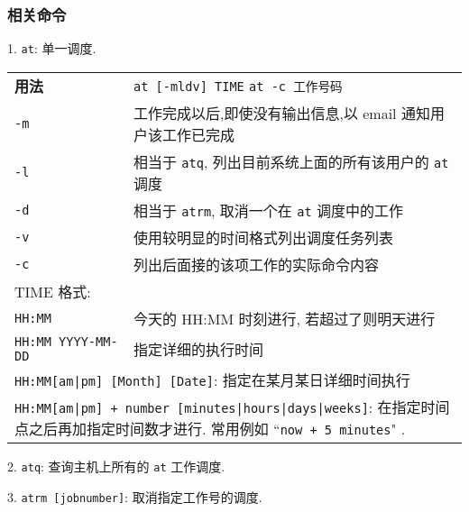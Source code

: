\subsubsection{相关命令}
\par
1. \texttt{at}: 单一调度.
\begin{longtable}{l@{ : }p{}}\hline\hline

    \textbf{用法} & \verb"at [-mldv] TIME" \newline
                    \verb"at -c 工作号码"  \\

    \texttt{-m} & 工作完成以后,即使没有输出信息,以 email 通知用户该工作已完成\\

    \texttt{-l} & 相当于 \texttt{atq}, 列出目前系统上面的所有该用户的 \texttt{at} 调度\\

    \texttt{-d} & 相当于 \texttt{atrm}, 取消一个在 \texttt{at} 调度中的工作 \\

    \texttt{-v} & 使用较明显的时间格式列出调度任务列表\\

    \texttt{-c} & 列出后面接的该项工作的实际命令内容 \\

    \multicolumn{2}{l}{TIME 格式:}\\

    \texttt{HH:MM} & 今天的 HH:MM 时刻进行, 若超过了则明天进行 \\

    \texttt{HH:MM YYYY-MM-DD} & 指定详细的执行时间 \\

    \multicolumn{2}{l}{\texttt{HH:MM[am|pm] [Month] [Date]}:  指定在某月某日详细时间执行} \\

    \multicolumn{2}{p{\columnwidth}}{\texttt{HH:MM[am|pm] + number [minutes|hours|days|weeks]}: 在指定时间点之后再加指定时间数才进行. 常用例如 ``\texttt{now + 5 minutes}" .} \\

    \hline
\end{longtable}

\par
2. \texttt{atq}: 查询主机上所有的 \texttt{at} 工作调度.

\par
3. \texttt{atrm [jobnumber]}: 取消指定工作号的调度.

